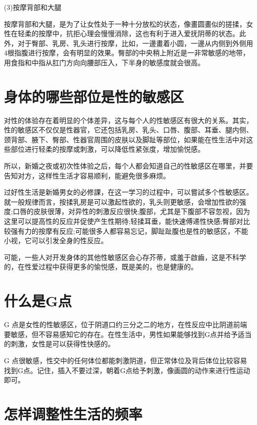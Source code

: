\documentclass[12pt,UTF8]{ctexbook}
\begin{document}
(3)按摩背部和大腿

按摩背部和大腿，是为了让女性处于一种十分放松的状态，像畫圆畫似的搓揉，女性在轻柔的按摩中，抗拒心理会慢慢消除，这也有利于进入爱抚阴蒂的状态。此外，对于臀部、乳房、乳头进行按摩，比如，一邊畫着小圆，一邊从内侧到外侧用4根指腹进行按摩，会有明显的效果。臀部的中央稍上附近是一非常敏感的地带，用食指和中指从肛门方向向腰部压入，下半身的敏感度就会很高。

\section{身体的哪些部位是性的敏感区}

对性的体验存在着明显的个体差异，这与每个人的性敏感区有很大的关系。其实，性的敏感区不仅仅是性器官，它还包括乳房、乳头、口唇、腹部、耳垂、腿内侧、颈背部、腋下、臀部、性器官周围的皮肤以及脚趾等部位，如果能在性生活中对这些部位进行轻柔的按摩或刺激，可以降低性紧张度，增加愉悦感。

所以，新婚之夜或初次性体验之后，每个人都会知道自己的性敏感区在哪里，并要告知对方，这样性生活才容易顺利，能避免很多麻烦。

过好性生活是新婚男女的必修課，在这一学习的过程中，可以嘗試多个性敏感区。就一般规律而言，按揉乳房是可以激起性欲的，乳头则更敏感，会增加性欲的强度;口唇的皮肤很薄，对异性的刺激反应很快;腹部，尤其是下腹部不容忽视，因为这里可以提高性的反应并促使产生性期待;轻揉耳垂，能快速傅递性快感;臀部对比较强有力的按摩有反应;可能很多人都容易忘记，脚趾趾腹也是性的敏感区，不能小视，它可以引发全身的性反应。

可能，一些人对开发身体的其他性敏感区会心存芥蒂，或羞于啟齒，这是不科学的，在性爱过程中获得更多的愉悦感，既是美的，也是健康的。

\section{什么是G点}

G 点是女性的性敏感区，位于阴道口约三分之二的地方，在性反应中比阴道前端要敏感，但不容易感知它的存在。在性生活中，男性如果能够找到G点并给予适当的刺激，女性是可以获得性快感的。

G 点很敏感，性交中的任何体位都能刺激阴道，但正常体位及背后体位比较容易找到G点。记住，插入不要过深，朝着G点给予刺激，像画圆的动作来进行性运动即可。

\section{怎样调整性生活的频率}
\end{document}
